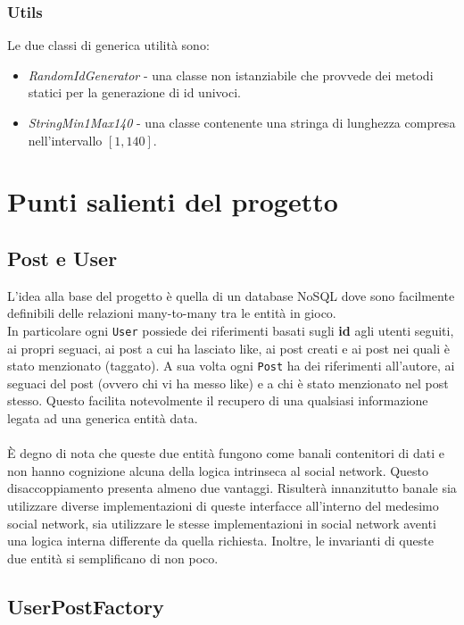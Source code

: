\documentclass[a4paper,10pt]{book}
\begin{document}
\subsubsection*{Utils}
Le due classi di generica utilità sono:
\begin{itemize}
    \item \emph{RandomIdGenerator} - una classe non istanziabile che provvede dei metodi statici per la generazione di id univoci.
    \item \emph{StringMin1Max140} - una classe contenente una stringa di lunghezza compresa nell'intervallo $[1, 140]$.
\end{itemize}


\newpage

\section*{Punti salienti del progetto}

\subsection*{Post e User}
L'idea alla base del progetto è quella di un database NoSQL dove sono facilmente definibili delle relazioni many-to-many tra le entità in gioco.\\
In particolare ogni \texttt{User} possiede dei riferimenti basati sugli \textbf{id} agli utenti seguiti, ai propri seguaci, ai post a cui ha lasciato like,
ai post creati e ai post nei quali è stato menzionato (taggato). A sua volta ogni \texttt{Post} ha dei riferimenti all'autore, ai seguaci del post (ovvero chi vi ha messo like)
e a chi è stato menzionato nel post stesso. Questo facilita notevolmente il recupero di una qualsiasi informazione legata ad una generica entità data.
\\~\\
È degno di nota che queste due entità fungono come banali contenitori di dati e non hanno cognizione alcuna della logica intrinseca al social network.
Questo disaccoppiamento presenta almeno due vantaggi. Risulterà innanzitutto banale sia utilizzare diverse implementazioni di queste interfacce
all'interno del medesimo social network, sia utilizzare le stesse implementazioni in social network aventi una logica interna differente da quella
richiesta. Inoltre, le invarianti di queste due entità si semplificano di non poco.

\subsection*{UserPostFactory}
\end{document}
